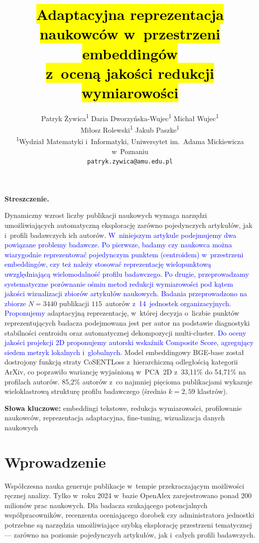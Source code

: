 \documentclass[a4paper,11pt,twocolumn]{article}
\title{%
  \Large\bfseries
  \hl{Adaptacyjna reprezentacja naukowców w~przestrzeni embeddingów}\\
  \hl{z~oceną jakości redukcji wymiarowości}%
}
\author{%
  Patryk Żywica\textsuperscript{1} \quad
  Daria Dworzyńska-Wujec\textsuperscript{1} \quad
  Michał Wujec\textsuperscript{1}\\
  Miłosz Rolewski\textsuperscript{1} \quad
  Jakub Paszke\textsuperscript{1}\\[4pt]
  \textsuperscript{1}Wydział Matematyki i~Informatyki,
  Uniwersytet im.~Adama Mickiewicza w~Poznaniu\\
  \texttt{patryk.zywica@amu.edu.pl}
}
\date{}
\newcommand{\hl}[1]{\textcolor{blue}{#1}}
\renewenvironment{abstract}{%
  \small\quotation\noindent\textbf{Streszczenie.}\enspace
}{\endquotation}
\begin{document}
\maketitle
\thispagestyle{empty}

\begin{abstract}
Dynamiczny wzrost liczby publikacji naukowych wymaga narzędzi umożliwiających
automatyczną eksplorację zarówno pojedynczych artykułów, jak i~profili
badawczych ich autorów.
\hl{W~niniejszym artykule podejmujemy dwa powiązane problemy badawcze.
Po pierwsze, badamy czy naukowca można wiarygodnie reprezentować
pojedynczym punktem (centroidem) w~przestrzeni embeddingów, czy też
należy stosować reprezentację wielopunktową uwzględniającą wielomodalność
profilu badawczego. Po drugie, przeprowadzamy systematyczne porównanie
ośmiu metod redukcji wymiarowości pod kątem jakości wizualizacji
zbiorów artykułów naukowych.}
\hl{Badania przeprowadzono na zbiorze} $N=3440$ publikacji
$115$~autorów \hl{z~14~jednostek organizacyjnych}.
\hl{Proponujemy} adaptacyjną reprezentację, w~której
decyzja o~liczbie punktów reprezentujących badacza
podejmowana jest per autor na podstawie diagnostyki
stabilności centroidu oraz automatycznej dekompozycji multi-cluster.
\hl{Do oceny jakości projekcji 2D proponujemy autorski wskaźnik
Composite Score, agregujący siedem metryk lokalnych i~globalnych.}
Model embeddingowy BGE-base został dostrojony funkcją straty CoSENTLoss
z~hierarchiczną odległością kategorii ArXiv, co poprawiło wariancję
wyjaśnioną w~PCA~2D z~33,11\% do 54,71\% na profilach autorów.
85,2\% autorów z~co najmniej pięcioma publikacjami wykazuje wieloklastrową
strukturę profilu badawczego (średnio $k=2{,}59$ klastrów).
\end{abstract}

\smallskip\noindent
\textbf{Słowa kluczowe:}
embeddingi tekstowe, redukcja wymiarowości, profilowanie naukowców,
reprezentacja adaptacyjna, fine-tuning, wizualizacja danych naukowych

\section{Wprowadzenie}
\label{sec:intro}

Współczesna nauka generuje publikacje w~tempie przekraczającym możliwości
ręcznej analizy. Tylko w~roku 2024 w~bazie OpenAlex zarejestrowano ponad
200 milionów prac naukowych. Dla badacza szukającego potencjalnych
współpracowników, recenzenta oceniającego dorobek czy administratora
jednostki potrzebne są narzędzia umożliwiające szybką eksplorację
przestrzeni tematycznej --- zarówno na poziomie pojedynczych artykułów,
jak i~całych profili badawczych.
\end{document}
